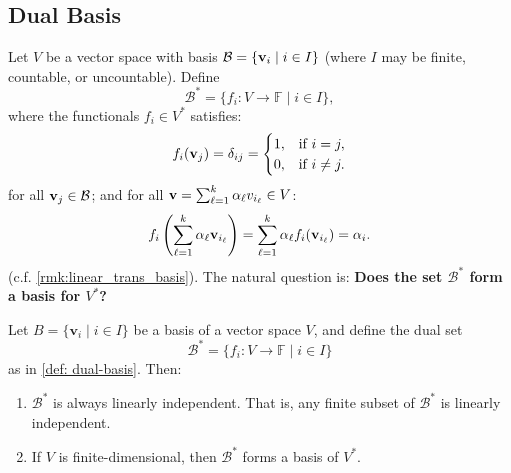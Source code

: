 \subsection{Dual Basis}
\begin{definition}\label{def: dual-basis}
Let $V$ be a vector space with basis $\mathcal{B} = \{{\bf v}_i \mid i \in I\}$ (where $I$ may be finite, countable, or uncountable). Define
\[
\mathcal{B}^* = \{ f_i : V \to \mathbb{F} \mid i \in I \},
\]
where the functionals $f_i \in V^*$ satisfies:
\[
f_i({\bf v}_j) = \delta_{ij} = \begin{cases} 1, & \text{if } i = j, \\ 0, & \text{if } i \ne j. \end{cases}
\]
for all ${\bf v}_j \in \mathcal{B}$; and for all ${\bf v} = \sum_{\ell=1}^k \alpha_{\ell} v_{i_{\ell}} \in V$:
\[
f_i\left(\sum_{\ell=1}^k \alpha_{\ell} {\bf v}_{i_{\ell}}\right) = \sum_{\ell=1}^k \alpha_{\ell} f_i({\bf v}_{i_{\ell}}) = \alpha_i.
\]
(c.f. \autoref{rmk:linear_trans_basis}). The natural question is: \textbf{Does the set $\mathcal{B}^*$ form a basis for $V^*$?}
\end{definition}

\begin{proposition}\label{prop:dual-basis}
Let \( B = \{ \mathbf{v}_i \mid i \in I \} \) be a basis of a vector space \( V \), and define the dual set
\[
\mathcal{B}^* = \{ f_i : V \to \mathbb{F} \mid i \in I \}
\]
as in \autoref{def: dual-basis}. Then:
\begin{enumerate}
  \item \( \mathcal{B}^* \) is always linearly independent. That is, any finite subset of \( \mathcal{B}^* \) is linearly independent.
  \item If \( V \) is finite-dimensional, then \( \mathcal{B}^* \) forms a basis of \( V^* \).
\end{enumerate}
\end{proposition}


